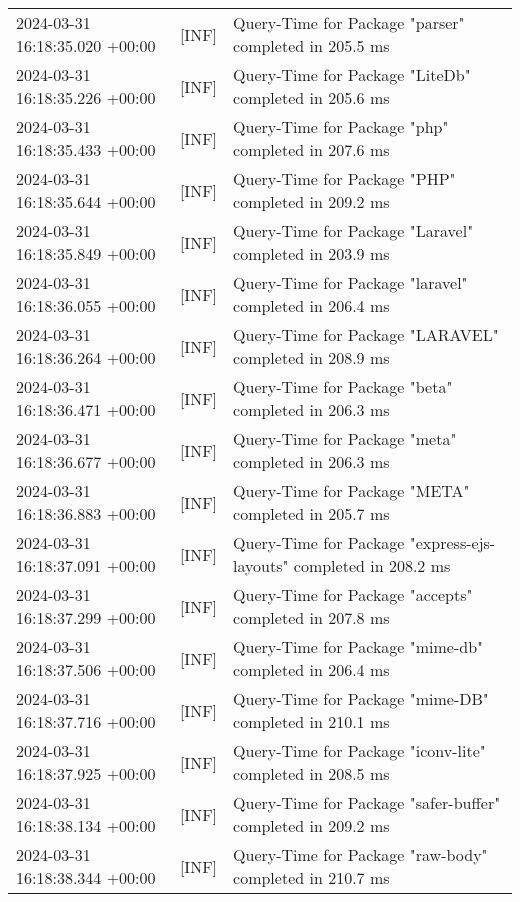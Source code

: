 {{\begin{tabularx}{\textwidth}{|l|l|X|}
                    2024-03-31 16:18:35.020 +00:00 & [INF] & Query-Time for Package "parser" completed in 205.5 ms \\
                    2024-03-31 16:18:35.226 +00:00 & [INF] & Query-Time for Package "LiteDb" completed in 205.6 ms \\
                    2024-03-31 16:18:35.433 +00:00 & [INF] & Query-Time for Package "php" completed in 207.6 ms \\
                    2024-03-31 16:18:35.644 +00:00 & [INF] & Query-Time for Package "PHP" completed in 209.2 ms \\
                    2024-03-31 16:18:35.849 +00:00 & [INF] & Query-Time for Package "Laravel" completed in 203.9 ms \\
                    2024-03-31 16:18:36.055 +00:00 & [INF] & Query-Time for Package "laravel" completed in 206.4 ms \\
                    2024-03-31 16:18:36.264 +00:00 & [INF] & Query-Time for Package "LARAVEL" completed in 208.9 ms \\
                    2024-03-31 16:18:36.471 +00:00 & [INF] & Query-Time for Package "beta" completed in 206.3 ms \\
                    2024-03-31 16:18:36.677 +00:00 & [INF] & Query-Time for Package "meta" completed in 206.3 ms \\
                    2024-03-31 16:18:36.883 +00:00 & [INF] & Query-Time for Package "META" completed in 205.7 ms \\
                    2024-03-31 16:18:37.091 +00:00 & [INF] & Query-Time for Package "express-ejs-layouts" completed in 208.2 ms \\
                    2024-03-31 16:18:37.299 +00:00 & [INF] & Query-Time for Package "accepts" completed in 207.8 ms \\
                    2024-03-31 16:18:37.506 +00:00 & [INF] & Query-Time for Package "mime-db" completed in 206.4 ms \\
                    2024-03-31 16:18:37.716 +00:00 & [INF] & Query-Time for Package "mime-DB" completed in 210.1 ms \\
                    2024-03-31 16:18:37.925 +00:00 & [INF] & Query-Time for Package "iconv-lite" completed in 208.5 ms \\
                    2024-03-31 16:18:38.134 +00:00 & [INF] & Query-Time for Package "safer-buffer" completed in 209.2 ms \\
                    2024-03-31 16:18:38.344 +00:00 & [INF] & Query-Time for Package "raw-body" completed in 210.7 ms \\

\end{tabularx}}}
